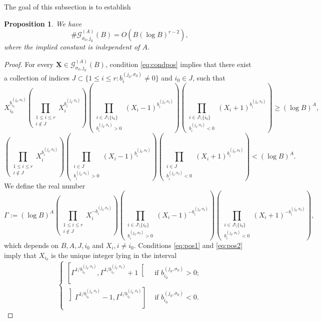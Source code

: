 \documentclass[11pt,letterpaper]{amsart}
\newcommand{\CG}{{\mathcal {G}}}
\newcommand{\XX}{\underline{\mathbf{X}}}
\theoremstyle{plain}
\numberwithin{equation}{section}
\newtheorem{proposition}[theorem]{Proposition}
\theoremstyle{definition}
\theoremstyle{remark}
\begin{document}
 The goal of this subsection is to establish 
\begin{proposition}\label{le:CGAB}
	We have $$\#\CG_{\sigma_0,j_0}^{(A)}(B)=O(B(\log B)^{r-2}),$$ where the implied constant is independent of $A$.
\end{proposition}
\begin{proof}
	For every $\XX\in\CG_{\sigma_0,j_0}^{(A)}(B)$, condition \eqref{eq:condpos} implies that there exist a collection of indices $J\subset \{1\leqslant i\leqslant r:b_{i}^{(j_0,\sigma_0)}\neq 0\}$ and $i_0\in J$, such that  \begin{equation}\label{eq:pos1}
		X_{i_0}^{b_{i_0}^{(j_0,\sigma_0)}}\left(\prod_{\substack{1\leqslant i\leqslant r\\i\not\in J}}X_i^{b_{i}^{(j_0,\sigma_0)}}\right)\left(\prod_{\substack{i\in J\setminus\{i_0\}\\b_{i}^{(j_0,\sigma_0)}>0}}\left(X_i-1\right)^{b_{i}^{(j_0,\sigma_0)}}\right)\left(\prod_{\substack{i\in J\setminus\{i_0\}\\b_i^{(j_0,\sigma_0)}<0}}\left(X_i+1\right)^{b_{i}^{(j_0,\sigma_0)}}\right)\geqslant (\log B)^A,
	\end{equation}
	\begin{equation}\label{eq:pos2}
		\left(\prod_{\substack{1\leqslant i\leqslant r\\ i\not\in J}}X_i^{b_{i}^{(j_0,\sigma_0)}}\right)\left(\prod_{\substack{i\in J\\b_{i}^{(j_0,\sigma_0)}>0}}\left(X_i-1\right)^{b_{i}^{(j_0,\sigma_0)}}\right)\left(\prod_{\substack{i\in J\\b_i^{(j_0,\sigma_0)}<0}}\left(X_i+1\right)^{b_{i}^{(j_0,\sigma_0)}}\right)< (\log B)^A.
	\end{equation}
	We define the real number 
	$$\Gamma:=(\log B)^A\left(\prod_{\substack{1\leqslant i\leqslant r\\ i\not\in J}}X_i^{-b_{i}^{(j_0,\sigma_0)}}\right)\left(\prod_{\substack{i\in J\setminus\{i_0\}\\b_{i}^{(j_0,\sigma_0)}>0}}\left(X_i-1\right)^{-b_{i}^{(j_0,\sigma_0)}}\right)\left(\prod_{\substack{i\in J\setminus\{i_0\}\\b_i^{(j_0,\sigma_0)}<0}}\left(X_i+1\right)^{-b_{i}^{(j_0,\sigma_0)}}\right),$$ which depends on $B,A,J,i_0$ and $X_i,i\neq i_0$.
	Conditions \eqref{eq:pos1} and \eqref{eq:pos2} imply that $X_{i_0}$ is the unique integer lying in the interval
	\begin{equation}\label{eq:condition4}
		\begin{cases}
			\left[\Gamma^{1/b_{i_0}^{(j_0,\sigma_0)}},\Gamma^{1/b_{i_0}^{(j_0,\sigma_0)}}+1\right[ &\text{ if } b_{i_0}^{(j_0,\sigma_0)}>0;\\ \left]\Gamma^{1/b_{i_0}^{(j_0,\sigma_0)}}-1,\Gamma^{1/b_{i_0}^{(j_0,\sigma_0)}}\right]&\text{ if } b_{i_0}^{(j_0,\sigma_0)}<0.

\end{cases}
\end{equation}
\end{proof}
\end{document}
